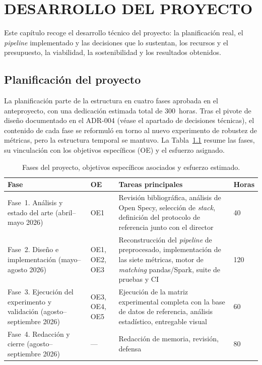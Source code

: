 \chapter{DESARROLLO DEL PROYECTO}

Este capítulo recoge el desarrollo técnico del proyecto: la planificación real, el \textit{pipeline} implementado y las decisiones que lo sustentan, los recursos y el presupuesto, la viabilidad, la sostenibilidad y los resultados obtenidos.

\section{Planificación del proyecto}

La planificación parte de la estructura en cuatro fases aprobada en el anteproyecto, con una dedicación estimada total de 300~horas. Tras el pivote de diseño documentado en el ADR-004 (véase el apartado de decisiones técnicas), el contenido de cada fase se reformuló en torno al nuevo experimento de robustez de métricas, pero la estructura temporal se mantuvo. La Tabla~\ref{tab:fases} resume las fases, su vinculación con los objetivos específicos (OE) y el esfuerzo asignado.

\begin{table}[H]
  \centering
  \small
  \begin{tabular}{@{}p{}p{}p{}p{}@{}}
    \toprule
    \textbf{Fase} & \textbf{OE} & \textbf{Tareas principales} & \textbf{Horas} \\
    \midrule
    Fase~1. Análisis y estado del arte (abril--mayo 2026) & OE1 & Revisión bibliográfica, análisis de Open Specy, selección de \textit{stack}, definición del protocolo de referencia junto con el director & 40 \\
    \addlinespace
    Fase~2. Diseño e implementación (mayo--agosto 2026) & OE1, OE2, OE3 & Reconstrucción del \textit{pipeline} de preprocesado, implementación de las siete métricas, motor de \textit{matching} pandas/Spark, suite de pruebas y CI & 120 \\
    \addlinespace
    Fase~3. Ejecución del experimento y validación (agosto--septiembre 2026) & OE3, OE4, OE5 & Ejecución de la matriz experimental completa con la base de datos de referencia, análisis estadístico, entregable visual & 60 \\
    \addlinespace
    Fase~4. Redacción y cierre (agosto--septiembre 2026) & --- & Redacción de memoria, revisión, defensa & 80 \\
    \bottomrule
  \end{tabular}
  \caption{Fases del proyecto, objetivos específicos asociados y esfuerzo estimado.}
  \label{tab:fases}
\end{table}


